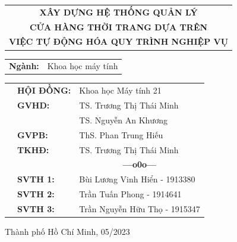 \documentclass[a4paper, twoside, 12pt]{report}
\theoremstyle{definition}
\newcommand{\setupfont}[1]{\fontsize{#1}{#1}\selectfont}
\begin{document}
\begin{titlepage}
	\vspace*{0.5cm}

	\begin{center}
		\setupfont{17pt}
		\begin{tabular}{c}
			\textbf{{XÂY DỰNG HỆ THỐNG QUẢN LÝ}}    \\
			\textbf{{CỬA HÀNG THỜI TRANG DỰA TRÊN}} \\
			\textbf{{VIỆC TỰ ĐỘNG HÓA QUY TRÌNH NGHIỆP VỤ}}
		\end{tabular}
	\end{center}

	\vspace{0.5cm}


	\begin{center}
		\setupfont{14pt}
		\begin{tabular}{rl}
			\textbf{Ngành:} & Khoa học máy tính
		\end{tabular}
	\end{center}


	\begin{table}[h]
		\setupfont{13pt}
		\begin{tabular}{rll}
			\hspace{5 cm} & \textbf{HỘI ĐỒNG:} & Khoa học Máy tính 21                         \\
			              & \textbf{GVHD:}     & TS. Trương Thị Thái Minh                     \\
			              &                    & TS. Nguyễn An Khương                         \\
			              & \textbf{GVPB:}     & ThS. Phan Trung Hiếu                         \\
			              & \textbf{TKHĐ:}     & TS. Trương Thị Thái Minh                     \\
			              &                    & \multicolumn{1}{c}{\bf---o0o---}\vspace{2mm} \\
			              & \textbf{SVTH 1:}   & Bùi Lương Vinh Hiển - 1913380                \\
			              & \textbf{SVTH 2:}   & Trần Tuấn Phong - 1914641                    \\
			              & \textbf{SVTH 3:}   & Trần Nguyễn Hữu Thọ - 1915347                \\
		\end{tabular}
	\end{table}

	\begin{center}
		{\setupfont{12pt} Thành phố Hồ Chí Minh, 05/2023}
	\end{center}
\end{titlepage}
\end{document}
